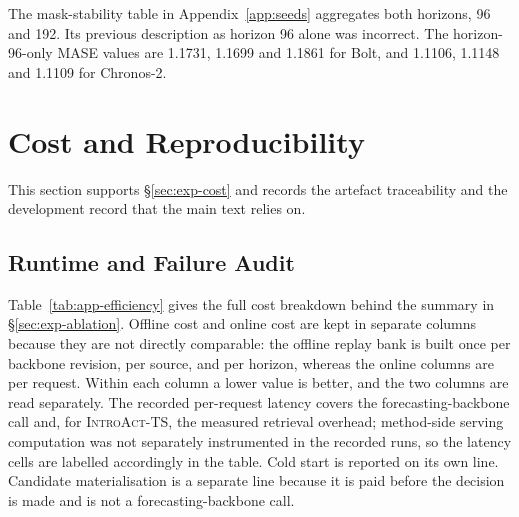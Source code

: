 \documentclass{article}
\newcommand{\introact}{\textsc{IntroAct-TS}}
\begin{document}
The mask-stability table in Appendix~\ref{app:seeds} aggregates both horizons, 96 and 192.
Its previous description as horizon 96 alone was incorrect. The horizon-96-only MASE values
are 1.1731, 1.1699 and 1.1861 for Bolt, and 1.1106, 1.1148 and 1.1109 for Chronos-2.

\section{Cost and Reproducibility}

This section supports \S\ref{sec:exp-cost} and records the artefact traceability and the
development record that the main text relies on.

\subsection{Runtime and Failure Audit}
\label{app:calls}
Table~\ref{tab:app-efficiency} gives the full cost breakdown behind the summary in
\S\ref{sec:exp-ablation}. Offline cost and online cost are kept in separate columns because
they are not directly comparable: the offline replay bank is built once per backbone revision,
per source, and per horizon, whereas the online columns are per request. Within each column a
lower value is better, and the two columns are read separately. The recorded per-request
latency covers the forecasting-backbone call and, for \introact{}, the measured retrieval
overhead; method-side serving computation was not separately instrumented in the recorded
runs, so the latency cells are labelled accordingly in the table. Cold start is
reported on its own line. Candidate materialisation is a separate line because it is paid
before the decision is made and is not a forecasting-backbone call.
\end{document}
